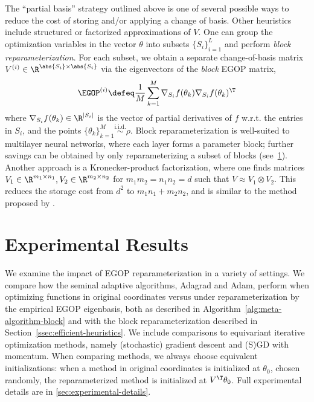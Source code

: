 \documentclass{article}
\begin{document}
The ``partial basis'' strategy outlined above is one of several possible ways to reduce the cost of storing and/or applying a change of basis. Other heuristics include structured or factorized approximations of $V$. One can group the optimization variables in the vector $\theta$ into subsets $\{S_i\}_{i=1}^L$ and perform \textit{block reparameterization}. For each subset, we obtain a separate change-of-basis matrix $V^{(i)} \in \R^{\abs{S_i} \times \abs{S_i}}$ via the eigenvectors of the \emph{block} EGOP matrix,
\begin{equation}
    \EGOP^{(i)} \defeq \frac{1}{M}\sum_{k=1}^M \nabla_{S_i} f(\theta_k)\nabla_{S_i} f(\theta_k)^\T
    \label{eq:block-egop}
\end{equation}
where $\nabla_{S_i} f(\theta_k) \in \R^{|S_i|}$ is the vector of partial derivatives of $f$ w.r.t. the entries in $S_i$, and the points $\{\theta_k\}_{k=1}^M \overset{\mathrm{i.i.d.}}{\sim} \rho$. Block reparameterization is well-suited to multilayer neural networks, where each layer forms a parameter block; further savings can be obtained by only reparameterizing a subset of blocks (see~\cref{sec:experimental-results}). Another approach is a Kronecker-product factorization, where one finds matrices $V_1 \in \R^{m_1\times n_1}, V_2 \in \R^{m_2 \times n_2}$ for $m_1 m_2 = n_1 n_2 = d$ such that $V \approx V_1\otimes V_2$. This reduces the storage cost from $d^2$ to $m_1 n_1 + m_2 n_2$, and is similar to the method proposed by \citet{vyas2024soap}.

\section{Experimental Results}\label{sec:experimental-results}

We examine the impact of EGOP reparameterization in a variety of settings. We compare how the seminal adaptive algorithms, Adagrad and Adam, perform when optimizing functions in original coordinates versus under reparameterization by the empirical EGOP eigenbasis, both as described in Algorithm~\ref{alg:meta-algorithm-block} and with the block reparameterization described in Section~\ref{ssec:efficient-heuristics}. We include comparisons to equivariant iterative optimization methods, namely (stochastic) gradient descent and (S)GD with momentum. When comparing methods, we always choose equivalent initializations: when a method in original coordinates is initialized at $\theta_0$, chosen randomly, the reparameterized method is initialized at $V^\T\theta_0$. Full experimental details are in \cref{sec:experimental-details}.
\end{document}
